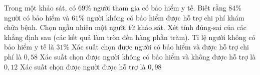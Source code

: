 \begin{ex}
	Trong một khảo sát, có $69\%$ người tham gia có bảo hiểm y tế. Biết rằng $84\%$ người có bảo hiểm và $61\% $ người không có bảo hiểm được hỗ trợ chi phí khám chữa bệnh. Chọn ngẫu nhiên một người từ khảo sát. Xét tính đúng-sai của các khẳng định sau (các kết quả làm tròn đến hàng phần trăm).
	\choiceTF
	{ \True  Tỉ lệ người không có bảo hiểm y tế là $31\%$ }
	{ \True  Xác suất chọn được người có bảo hiểm và được hỗ trợ chi phí là ${0,58}$ }
	{ \True  Xác suất chọn được người không có bảo hiểm và không được hỗ trợ là ${0,12}$ }
	{ Xác suất chọn được người được hỗ trợ là ${0,98}$ }
	\end{ex}
